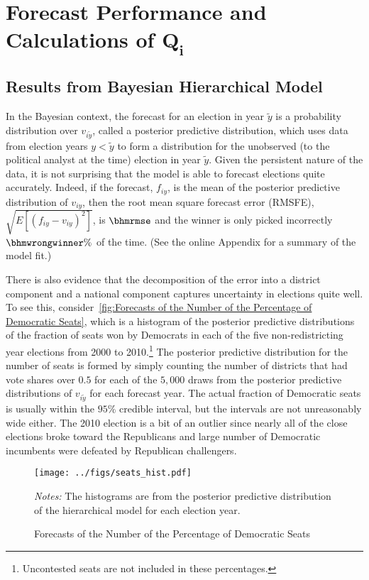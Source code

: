 \documentclass[12pt,final,fleqn]{article}
\theoremstyle{plain}
\begin{document}
\section{Forecast Performance and Calculations of $\mathbf{Q_i}$}
\subsection{Results from Bayesian Hierarchical Model} \label{sec: results hierarchical model}
In the Bayesian context, the forecast for an election in year $\tilde{y}$ is a probability distribution over $v_{i\tilde{y}}$, called a posterior predictive distribution, which uses data from election years $y < \tilde{y}$ to form a distribution for the unobserved (to the political analyst at the time) election in year $\tilde{y}$. Given the persistent nature of the data, it is not surprising that the model is able to forecast elections quite accurately. Indeed, if the forecast, $f_{iy}$, is the mean of the posterior predictive distribution of $v_{iy}$, then the root mean square forecast error (RMSFE), $\sqrt{E[(f_{iy} - v_{iy})^2]}$, is $\bhmrmse$ and the winner is only picked incorrectly $\bhmwrongwinner\%$ of the time. (See the online Appendix for a summary of the model fit.) 

There is also evidence that the decomposition of the error into a district component and a national component captures uncertainty in elections quite well. To see this, consider~\autoref{fig:Forecasts of the Number of the Percentage of Democratic Seats}, which is a histogram of the posterior predictive distributions of the fraction of seats won by Democrats in each of the five non-redistricting year elections from 2000 to 2010.\footnote{Uncontested seats are not included in these percentages.} The posterior predictive distribution for the number of seats is formed by simply counting the number of districts that had vote shares over $0.5$ for each of the $5,000$ draws from the posterior predictive distributions of $v_{i\tilde{y}}$ for each forecast year. The actual fraction of Democratic seats is usually within the $95\%$ credible interval, but the intervals are not unreasonably wide either. The 2010 election is a bit of an outlier since nearly all of the close elections broke toward the Republicans and large number of Democratic incumbents were defeated by Republican challengers. 

\begin{figure}[!htb]
\centering
\texttt{[image: ../figs/seats\_hist.pdf]}
\vspace{.5cm}
\caption{Forecasts of the Number of the Percentage of Democratic Seats}
\label{fig:Forecasts of the Number of the Percentage of Democratic Seats}
\begin{minipage}{\linewidth}
\footnotesize
\emph{Notes:} The histograms are from the posterior predictive distribution of the hierarchical model for each election year.
\end{minipage}
\end{figure}
\end{document}
